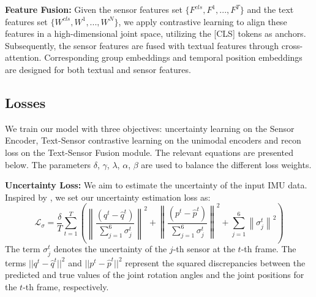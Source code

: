 \documentclass[letterpaper]{article} %
\begin{document}
\textbf{Feature Fusion:}
Given the sensor features set $\{{F^{cls}, F^{1}, ..., F^{T}}\}$ and the text features set $\{{W^{cls}, W^{1}, ..., W^{N}}\}$, we apply contrastive learning to align these features in a high-dimensional joint space, utilizing the [CLS] tokens as anchors.
Subsequently, the sensor features are fused with textual features through cross-attention. Corresponding group embeddings and temporal position embeddings are designed for both textual and sensor features.


\subsection{Losses} 
We train our model with three objectives: uncertainty learning on the Sensor Encoder, Text-Sensor contrastive learning on the unimodal encoders and recon loss on the Text-Sensor Fusion module. 
The relevant equations are presented below. The parameters $\delta$, $\gamma$, $\lambda$, $\alpha$, $\beta$ are used to balance the different loss weights.

\textbf{Uncertainty Loss:} We aim to estimate the uncertainty of the input IMU data. Inspired by \cite{kendall2017uncertainties}, we set our uncertainty estimation loss as:
\begin{equation}
\mathcal{L}_\sigma = \frac{\delta}{T} \sum_{t=1}^T(\left\|\frac{({q}^t-\hat q^t)}{ \sum_{j=1}^6\sigma_j^{t}}\right\|^2 + \left\|\frac{({p}^t-\hat p^t)}{ \sum_{j=1}^6\sigma_j^{t}}\right\|^2 +\sum_{j=1}^6\left\|\sigma_j^{t}\right\|^2)
\end{equation}
The term $\sigma_j^{t}$ denotes the uncertainty of the $j$-th sensor at the $t$-th frame. The terms $||{q}^t -\hat q^t||^2$ and $||{p}^t - \hat p^t||^2$ represent the squared discrepancies between the predicted and true values of the joint rotation angles and the joint positions for the $t$-th frame, respectively.
\end{document}
